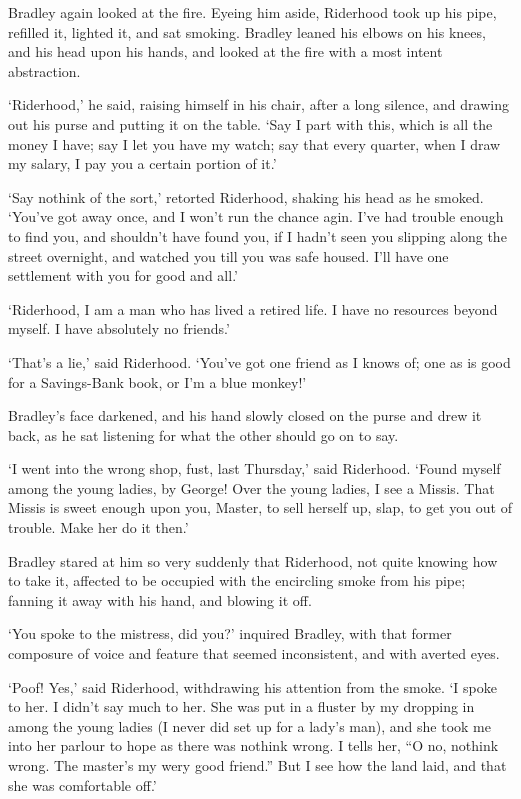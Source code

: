 Bradley again looked at the fire. Eyeing him aside, Riderhood took up
his pipe, refilled it, lighted it, and sat smoking. Bradley leaned his
elbows on his knees, and his head upon his hands, and looked at the fire
with a most intent abstraction.

‘Riderhood,’ he said, raising himself in his chair, after a long
silence, and drawing out his purse and putting it on the table. ‘Say
I part with this, which is all the money I have; say I let you have
my watch; say that every quarter, when I draw my salary, I pay you a
certain portion of it.’

‘Say nothink of the sort,’ retorted Riderhood, shaking his head as he
smoked. ‘You’ve got away once, and I won’t run the chance agin. I’ve had
trouble enough to find you, and shouldn’t have found you, if I hadn’t
seen you slipping along the street overnight, and watched you till you
was safe housed. I’ll have one settlement with you for good and all.’

‘Riderhood, I am a man who has lived a retired life. I have no resources
beyond myself. I have absolutely no friends.’

‘That’s a lie,’ said Riderhood. ‘You’ve got one friend as I knows of;
one as is good for a Savings-Bank book, or I’m a blue monkey!’

Bradley’s face darkened, and his hand slowly closed on the purse and
drew it back, as he sat listening for what the other should go on to
say.

‘I went into the wrong shop, fust, last Thursday,’ said Riderhood.
‘Found myself among the young ladies, by George! Over the young ladies,
I see a Missis. That Missis is sweet enough upon you, Master, to sell
herself up, slap, to get you out of trouble. Make her do it then.’

Bradley stared at him so very suddenly that Riderhood, not quite knowing
how to take it, affected to be occupied with the encircling smoke from
his pipe; fanning it away with his hand, and blowing it off.

‘You spoke to the mistress, did you?’ inquired Bradley, with that
former composure of voice and feature that seemed inconsistent, and with
averted eyes.

‘Poof! Yes,’ said Riderhood, withdrawing his attention from the smoke.
‘I spoke to her. I didn’t say much to her. She was put in a fluster by
my dropping in among the young ladies (I never did set up for a lady’s
man), and she took me into her parlour to hope as there was nothink
wrong. I tells her, “O no, nothink wrong. The master’s my wery good
friend.” But I see how the land laid, and that she was comfortable off.’


